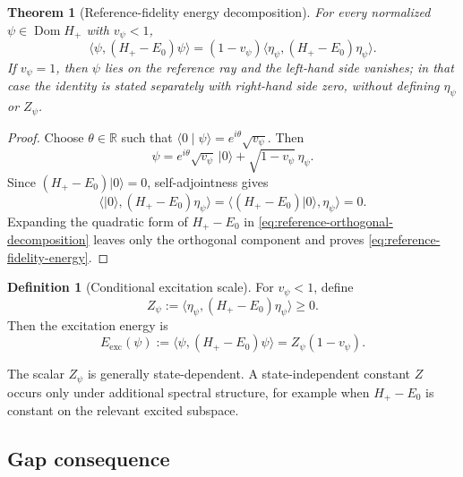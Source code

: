 \documentclass[11pt,reqno]{scrartcl}
\newcommand{\RR}{\mathbb R}
\newcommand{\ket}[1]{\lvert #1\rangle}
\newcommand{\braket}[2]{\langle #1\mid #2\rangle}
\newcommand{\inner}[2]{\langle #1,#2\rangle}
\DeclareMathOperator{\Dom}{Dom}
\theoremstyle{plain}
\newtheorem{theorem}{Theorem}[section]
\theoremstyle{definition}
\newtheorem{definition}[definition]{Definition}
\theoremstyle{remark}
\begin{document}
\begin{theorem}[Reference-fidelity energy decomposition]
\label{thm:reference-fidelity}
For every normalized \(\psi\in\Dom H_+\) with \(v_\psi<1\),
\begin{equation}
  \boxed{
  \inner{\psi}{(H_+-E_0)\psi}
  =(1-v_\psi)
  \inner{\eta_\psi}{(H_+-E_0)\eta_\psi}.}
  \label{eq:reference-fidelity-energy}
\end{equation}
If \(v_\psi=1\), then \(\psi\) lies on the reference ray and the left-hand
side vanishes; in that case the identity is stated separately with right-hand
side zero, without defining \(\eta_\psi\) or \(Z_\psi\).
\end{theorem}

\begin{proof}
Choose \(\theta\in\RR\) such that
\(\braket0\psi=e^{i\theta}\sqrt{v_\psi}\).  Then
\begin{equation}
  \psi=e^{i\theta}\sqrt{v_\psi}\,\ket0
       +\sqrt{1-v_\psi}\,\eta_\psi.
  \label{eq:reference-orthogonal-decomposition}
\end{equation}
Since \((H_+-E_0)\ket0=0\), self-adjointness gives
\begin{equation}
  \inner{\ket0}{(H_+-E_0)\eta_\psi}
  =\inner{(H_+-E_0)\ket0}{\eta_\psi}=0.
\end{equation}
Expanding the quadratic form of \(H_+-E_0\) in
\eqref{eq:reference-orthogonal-decomposition} leaves only the orthogonal
component and proves \eqref{eq:reference-fidelity-energy}.
\end{proof}

\begin{definition}[Conditional excitation scale]
\label{def:conditional-excitation-scale}
For \(v_\psi<1\), define
\begin{equation}
  Z_\psi
  :=\inner{\eta_\psi}{(H_+-E_0)\eta_\psi}\ge0.
  \label{eq:Zpsi}
\end{equation}
Then the excitation energy is
\begin{equation}
  E_{\mathrm{exc}}(\psi)
  :=\inner{\psi}{(H_+-E_0)\psi}
  =Z_\psi(1-v_\psi).
  \label{eq:Eexc-Zv}
\end{equation}
\end{definition}

The scalar \(Z_\psi\) is generally state-dependent.  A state-independent
constant \(Z\) occurs only under additional spectral structure, for example
when \(H_+-E_0\) is constant on the relevant excited subspace.

\subsection{Gap consequence}
\end{document}
